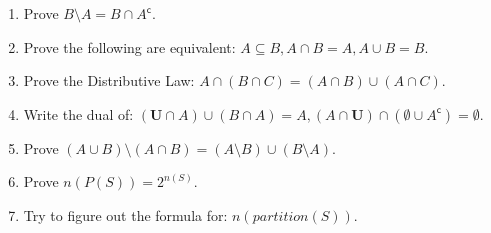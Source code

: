 \documentclass{article}
\newcommand{\setcomp}[1] {{#1}^{\mathsf{c}}}
\begin{document}
\begin{enumerate}
  \item Prove $B\setminus A = B\cap \setcomp{A}$.
  \item Prove the following are equivalent:
  $A\subseteq B, A \cap B = A, A\cup B = B$.

  \item Prove the Distributive Law:
  $A\cap(B\cap C) = (A\cap B)\cup (A\cap C)$.

  \item Write the dual of:
  $
  (\textbf{U} \cap A)\cup (B\cap A) = A,
  (A\cap \textbf{U})\cap (\emptyset \cup \setcomp{A}) = \emptyset
  $.

  \item Prove $(A\cup B)\setminus (A\cap B) = (A\setminus B)\cup (B\setminus A)$.

  \item Prove $n(P(S)) = 2^{n(S)}$.

  \item Try to figure out the formula for: $n(partition(S))$.

\end{enumerate}
\end{document}
